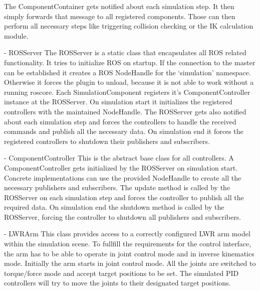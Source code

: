   The ComponentContainer gets notified about each simulation step. It then simply forwards that
  message to all registered components. Those can then perform all necessary steps like triggering
  collision checking or the IK calculation module.
  
- ROSServer
  The ROSServer is a static class that encapsulates all ROS related functionality. It tries to 
  initialize ROS on startup. If the connection to the master can be established it creates a
  ROS NodeHandle for the `simulation' namespace. Otherwise it forces the plugin to unload, because
  it is not able to work without a running roscore.
  Each SimulationComponent registers it's ComponentController instance at the ROSServer. On 
  simulation start it initializes the registered controllers with the maintained NodeHandle. The
  ROSServer gets also notified about each simulation step and forces the controllers to handle the
  received commands and publish all the necessary data.
  On simulation end it forces the registered controllers to shutdown their publishers and 
  subscribers.
  
- ComponentController
  This is the abstract base class for all controllers. A ComponentController gets initialized by
  the ROSServer on simulation start. Concrete implementations can use the provided NodeHandle to
  create all the necessary publishers and subscribers. The update method is called by the ROSServer
  on each simulation step and forces the controller to publish all the required data. On simulation
  end the shutdown method is called by the ROSServer, forcing the controller to shutdown all 
  publishers and subscribers.
  
- LWRArm
  This class provides access to a correctly configured LWR arm model within the simulation scene.
  To fullfill the requirements for the control interface, the arm has to be able to operate in joint
  control mode and in inverse kinematics mode. Initially the arm starts in joint control mode. All 
  the joints are switched to torque/force mode and accept target positions to be set. The simulated
  PID controllers will try to move the joints to their designated target positions. 
  
